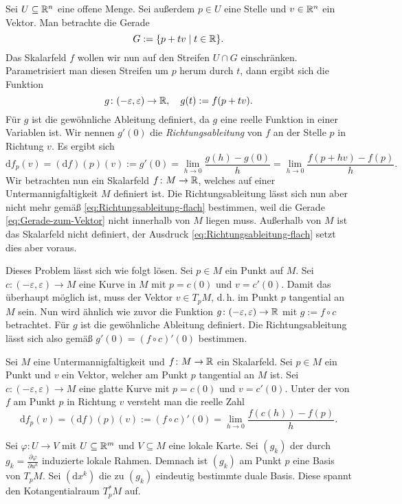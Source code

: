 Sei $U\subseteq\mathbb R^n$ eine offene Menge. Sei außerdem $p\in U$ 
eine Stelle und $v\in\mathbb R^n$ ein Vektor. Man betrachte die Gerade
\begin{equation}\label{eq:Gerade-zum-Vektor}
G := \{p+tv\mid t\in\mathbb R\}.
\end{equation}
Das Skalarfeld $f$ wollen wir nun auf den Streifen $U\cap G$
einschränken. Parametrisiert man diesen Streifen um $p$ herum durch
$t$, dann ergibt sich die Funktion%
\begin{equation}
g\colon (-\varepsilon,\varepsilon)\to\mathbb R,\quad g(t):=f(p+tv).
\end{equation}
Für $g$ ist die gewöhnliche Ableitung definiert, da $g$
eine reelle Funktion in einer Variablen ist. Wir nennen $g'(0)$ die
\emph{Richtungsableitung} von $f$ an der Stelle $p$ in Richtung $v$.
Es ergibt sich%
\begin{equation}\label{eq:Richtungsableitung-flach}
\mathrm df_p(v) = (\mathrm df)(p)(v) := g'(0)
= \lim_{h\to 0}\frac{g(h)-g(0)}{h}
= \lim_{h\to 0}\frac{f(p+hv)-f(p)}{h}.
\end{equation}
Wir betrachten nun ein Skalarfeld $f\colon M\to\mathbb R$, welches
auf einer Untermannigfaltigkeit $M$ definiert ist.
Die Richtungsableitung lässt sich nun aber nicht mehr gemäß
\eqref{eq:Richtungsableitung-flach} bestimmen, weil die Gerade
\eqref{eq:Gerade-zum-Vektor} nicht innerhalb von $M$ liegen muss.
Außerhalb von $M$ ist das Skalarfeld nicht definiert, der Ausdruck
\eqref{eq:Richtungsableitung-flach} setzt dies aber voraus.

Dieses Problem lässt sich wie folgt lösen. Sei $p\in M$ ein Punkt
auf $M$. Sei $c\colon (-\varepsilon,\varepsilon)\to M$ eine Kurve
in $M$ mit $p=c(0)$ und $v=c'(0)$. Damit das überhaupt möglich ist, muss
der Vektor $v\in T_p M$, d.\,h. im Punkt $p$ tangential an $M$ sein.
Nun wird ähnlich wie zuvor die Funktion
$g\colon (-\varepsilon,\varepsilon)\to\mathbb R$ mit $g:=f\circ c$ betrachtet.
Für $g$ ist die gewöhnliche Ableitung definiert. Die Richtungsableitung
lässt sich also gemäß $g'(0)=(f\circ c)'(0)$ bestimmen.

\begin{definition}[Richtungsableitung]
Sei $M$ eine Untermannigfaltigkeit und $f\colon M\to\mathbb R$ ein Skalarfeld.
Sei $p\in M$ ein Punkt und $v$ ein Vektor, welcher am Punkt $p$
tangential an $M$ ist. Sei $c\colon (-\varepsilon,\varepsilon)\to M$
eine glatte Kurve mit $p=c(0)$ und $v=c'(0)$. Unter der
 von $f$ am Punkt $p$ in Richtung $v$
versteht man die reelle Zahl
\begin{equation}
\mathrm df_p(v) = (\mathrm df)(p)(v) := (f\circ c)'(0)
= \lim_{h\to 0}\frac{f(c(h))-f(p)}{h}.
\end{equation}
\end{definition}
Sei $\varphi\colon U\to V$ mit $U\subseteq\mathbb R^m$ und $V\subseteq M$
eine lokale Karte. Sei $(g_k)$ der durch
$g_k=\frac{\partial\varphi}{\partial u^k}$ induzierte lokale
Rahmen. Demnach ist $(g_k)$ am Punkt $p$ eine
Basis von $T_p M$. Sei $(\mathrm dx^k)$ die zu $(g_k)$ eindeutig
bestimmte duale Basis. Diese spannt den Kotangentialraum $T_p^* M$ auf.

